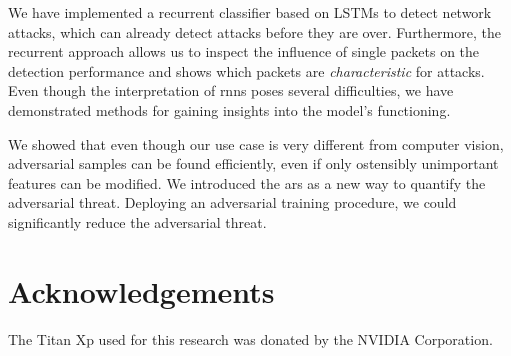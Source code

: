 \documentclass[conference]{IEEEtran}
\begin{document}
We have implemented a recurrent classifier based on LSTMs to detect network attacks, %
which can already detect attacks before they are over. Furthermore, the recurrent approach allows us to inspect the influence of single packets on the detection performance and shows which packets are \textit{characteristic} for attacks. 
Even though the interpretation of \glspl{rnn} poses several difficulties, we have demonstrated methods for gaining insights into the model's functioning.

We showed that even though our use case is very different from computer vision, adversarial samples can be found efficiently, even if only ostensibly unimportant features can be modified. We introduced the \gls{ars} as a new way to quantify the adversarial threat.
Deploying an adversarial training procedure, we could significantly reduce the adversarial threat.

\section*{Acknowledgements}
The Titan Xp used for this research was donated by the NVIDIA Corporation.


\renewcommand*{\bibfont}{\small}


\end{document}
